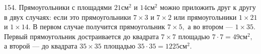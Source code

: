 154. Прямоугольники с площадями $21\text{см}^2$ и $14\text{см}^2$ можно приложить друг к другу в двух случаях: если это прямоугольники $7\times3$ и $7\times2$ или прямоугольники $1\times21$ и $1\times14.$ В первом случае получится прямоугольник $7\times5,$ а во втором --- $1\times35.$ Первый прямоугольник достраивается до квадрата $7\times7$ площадью $7\cdot7=49\text{см}^2,$ а второй --- до квадрата $35\times35$ площадью $35\cdot35=1225\text{см}^2.$\\
